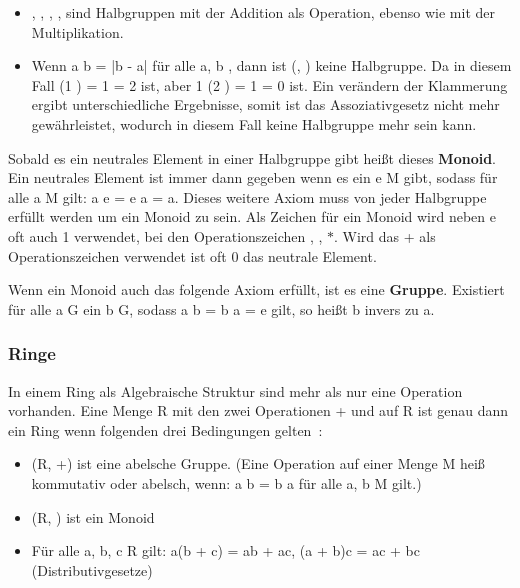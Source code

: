 			\begin{itemize}
				\item {}, , , ,  sind Halbgruppen mit der Addition als Operation, ebenso wie mit der Multiplikation.
				\item Wenn a \mycirc b = |b - a| für alle a, b \myin \myMenge{Z}, dann ist (, \mycircOhne) keine Halbgruppe. Da in diesem Fall (1 ) \mycirc 3 = 1  = 2 ist, aber 1 \mycirc (2 ) = 1  = 0 ist. Ein verändern der Klammerung ergibt unterschiedliche Ergebnisse, somit ist das Assoziativgesetz nicht mehr gewährleistet, wodurch  in diesem Fall keine Halbgruppe mehr sein kann.
			\end{itemize}

			Sobald es ein neutrales Element in einer Halbgruppe gibt heißt dieses \textbf{Monoid}. Ein neutrales Element ist immer dann gegeben wenn es ein e \myin M gibt, sodass für alle a \myin M gilt: a \mycirc e = e \mycirc a = a. Dieses weitere Axiom muss von jeder Halbgruppe erfüllt werden um ein Monoid zu sein. Als Zeichen für ein Monoid wird neben e oft auch 1 verwendet, bei den Operationszeichen \mycircOhne, \mycdotOhne, $*$. Wird das + als Operationszeichen verwendet ist oft 0 das neutrale Element.~\cite{Erste:Hilfe:in:Linearer:Algebra}

			Wenn ein Monoid auch das folgende Axiom erfüllt, ist es eine \textbf{Gruppe}. Existiert für alle a \myin G ein b \myin G, sodass a \mycirc b = b \mycirc a = e gilt, so heißt b invers zu a.~\cite{Erste:Hilfe:in:Linearer:Algebra}
		
		\subsubsection{Ringe}
			In einem Ring als Algebraische Struktur sind mehr als nur eine Operation vorhanden. Eine Menge R mit den zwei Operationen + und \mycdot auf R ist genau dann ein Ring wenn folgenden drei Bedingungen gelten~\cite{Erste:Hilfe:in:Linearer:Algebra}:
			
			\begin{itemize}
				\item (R, +) ist eine abelsche Gruppe. (Eine Operation \mycirc auf einer Menge M heiß kommutativ oder abelsch, wenn: a \mycirc b = b \mycirc a für alle a, b \myin M gilt.)
				\item (R, \mycdotOhne) ist ein Monoid
				\item Für alle a, b, c \myin R gilt: a(b + c) = ab + ac, (a + b)c = ac + bc (Distributivgesetze)
			\end{itemize}
			
